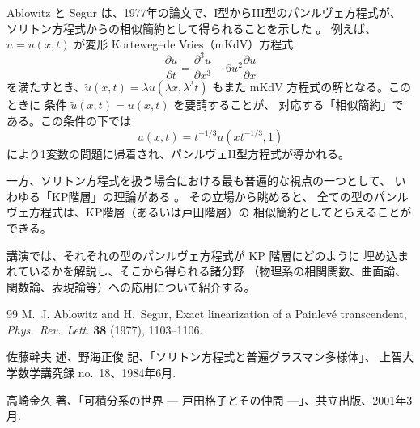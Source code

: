 \documentclass[uplatex,dvipdfmx]{jlreq}
\begin{document}
Ablowitz と Segur は、1977年の論文で、I型からIII型のパンルヴェ方程式が、
ソリトン方程式からの相似簡約として得られることを示した
\cite{AblowitzSegur}。
例えば、$u=u(x,t)$ が変形 Korteweg--de Vries（mKdV）方程式
\begin{equation*}
\frac{\partial u}{\partial t}
=\frac{\partial^3 u}{\partial x^3}
-6u^2\frac{\partial u}{\partial x}
\end{equation*}
を満たすとき、$\tilde{u}(x,t)=\lambda u(\lambda x,\lambda^3 t)$
もまた mKdV 方程式の解となる。このときに
条件 $\tilde{u}(x,t)=u(x,t)$ を要請することが、
対応する「相似簡約」である。この条件の下では
\begin{equation*}
u(x,t)=t^{-1/3}u( xt^{-1/3},1)
\end{equation*}
により1変数の問題に帰着され、パンルヴェII型方程式が導かれる。

一方、ソリトン方程式を扱う場合における最も普遍的な視点の一つとして、
いわゆる「KP階層」の理論がある \cite{SatoNoumi,Takasaki}。
その立場から眺めると、
全ての型のパンルヴェ方程式は、KP階層（あるいは戸田階層）の
相似簡約としてとらえることができる。

講演では、それぞれの型のパンルヴェ方程式が KP 階層にどのように
埋め込まれているかを解説し、そこから得られる諸分野
（物理系の相関関数、曲面論、関数論、表現論等）への応用について紹介する。

\begin{thebibliography}{99}
M.~J. Ablowitz and H.~Segur,
Exact linearization of a Painlevé transcendent,
\textit{Phys.\ Rev.\ Lett.} \textbf{38} (1977), 1103--1106.

佐藤幹夫 述、野海正俊 記、「ソリトン方程式と普遍グラスマン多様体」、
上智大学数学講究録 no.~18、1984年6月.

高崎金久 著、「可積分系の世界 --- 戸田格子とその仲間 ---」、共立出版、2001年3月.
\end{thebibliography}
\end{document}
